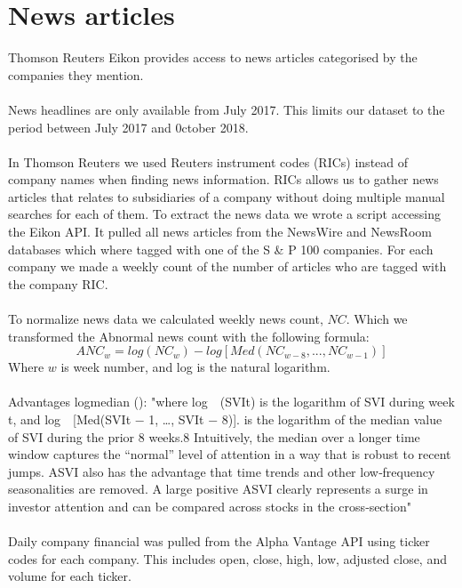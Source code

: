 \section{News articles}
Thomson Reuters Eikon provides access to news articles categorised by the companies they mention.
\\\\
News headlines are only available from July 2017. This limits our dataset to the period between July 2017 and 0ctober 2018.
\\\\
 In Thomson Reuters we used Reuters instrument codes (RICs) instead of company names when finding news information. RICs allows us to  gather news articles that relates to subsidiaries of a company without doing multiple manual searches for each of them. To extract the news data we wrote a script accessing the Eikon API. It pulled all news articles from the NewsWire and NewsRoom databases which where tagged with one of the S \& P 100 companies. For each company we made a weekly count of the number of articles who are tagged with the company RIC.
\\\\
To normalize news data we calculated weekly news count, $NC$. Which we transformed the Abnormal news count with the following formula:
\begin{equation}
   \label{abnormal_news} 
   ANC_{w} = log(NC_{w}) - log[Med(NC_{w-8},...,NC_{w-1})] 
\end{equation}
Where $w$ is week number, and log is the natural logarithm.
\\\\
Advantages logmedian (\cite{engelberg}): "where log (SVIt) is the logarithm of SVI during week t, and log [Med(SVIt − 1, …, SVIt − 8)]. is the logarithm of the median value of SVI during the prior 8 weeks.8 Intuitively, the median over a longer time window captures the “normal” level of attention in a way that is robust to recent jumps. ASVI also has the advantage that time trends and other low‐frequency seasonalities are removed. A large positive ASVI clearly represents a surge in investor attention and can be compared across stocks in the cross‐section"
\\\\
Daily company financial was pulled from the Alpha Vantage API using ticker codes for each company. This includes open, close, high, low, adjusted close, and volume for each ticker. 
\\\\
